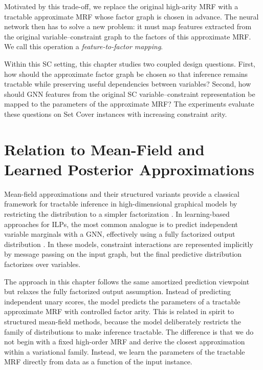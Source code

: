 Motivated by this trade-off, we replace the original high-arity MRF with a tractable approximate MRF whose factor graph is chosen in advance. The neural network then has to solve a new problem: it must map features extracted from the original variable--constraint graph to the factors of this approximate MRF. We call this operation a \emph{feature-to-factor mapping}.

Within this SC setting, this chapter studies two coupled design questions. First, how should the approximate factor graph be chosen so that inference remains tractable while preserving useful dependencies between variables? Second, how should GNN features from the original SC variable--constraint representation be mapped to the parameters of the approximate MRF? The experiments evaluate these questions on Set Cover instances with increasing constraint arity.

\section{Relation to Mean-Field and Learned Posterior Approximations}
\label{sec:chapter_5_relation_to_mean_field}

Mean-field approximations and their structured variants provide a classical framework for tractable inference in high-dimensional graphical models by restricting the distribution to a simpler factorization \cite{wainwright_graphical_2007, xing_generalized_2012}. In learning-based approaches for ILPs, the most common analogue is to predict independent variable marginals with a GNN, effectively using a fully factorized output distribution \cite{khalil_learning_2016, gasse_exact_2019, nair_solving_2020}. In these models, constraint interactions are represented implicitly by message passing on the input graph, but the final predictive distribution factorizes over variables.

The approach in this chapter follows the same amortized prediction viewpoint but relaxes the fully factorized output assumption. Instead of predicting independent unary scores, the model predicts the parameters of a tractable approximate MRF with controlled factor arity. This is related in spirit to structured mean-field methods, because the model deliberately restricts the family of distributions to make inference tractable. The difference is that we do not begin with a fixed high-order MRF and derive the closest approximation within a variational family. Instead, we learn the parameters of the tractable MRF directly from data as a function of the input instance.

